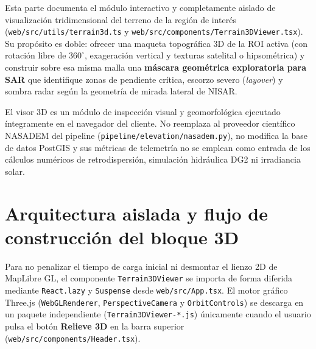\documentclass[11pt,a4paper]{article}
\newcommand{\src}[1]{\nolinkurl{#1}}
\begin{document}
Esta parte documenta el módulo interactivo y completamente aislado de visualización tridimensional del terreno
de la región de interés (\src{web/src/utils/terrain3d.ts} y \src{web/src/components/Terrain3DViewer.tsx}).
Su propósito es doble: ofrecer una maqueta topográfica 3D de la ROI activa (con rotación libre de $360^\circ$,
exageración vertical y texturas satelital o hipsométrica) y construir sobre esa misma malla una
\textbf{máscara geométrica exploratoria para SAR} que identifique zonas de pendiente crítica, escorzo severo
(\emph{layover}) y sombra radar según la geometría de mirada lateral de NISAR.

\begin{atencion}
El visor 3D es un módulo de inspección visual y geomorfológica ejecutado íntegramente en el navegador del
cliente. No reemplaza al proveedor científico NASADEM del pipeline (\src{pipeline/elevation/nasadem.py}), no
modifica la base de datos PostGIS y sus métricas de telemetría no se emplean como entrada de los cálculos
numéricos de retrodispersión, simulación hidráulica DG2 ni irradiancia solar.
\end{atencion}

\section{Arquitectura aislada y flujo de construcción del bloque 3D}
\label{sec:relieve3d-arquitectura}

Para no penalizar el tiempo de carga inicial ni desmontar el lienzo 2D de MapLibre GL, el componente
\texttt{Terrain3DViewer} se importa de forma diferida mediante \texttt{React.lazy} y \texttt{Suspense} desde
\src{web/src/App.tsx}. El motor gráfico Three.js (\texttt{WebGLRenderer}, \texttt{PerspectiveCamera} y
\texttt{OrbitControls}) se descarga en un paquete independiente (\texttt{Terrain3DViewer-*.js}) únicamente
cuando el usuario pulsa el botón \textbf{Relieve 3D} en la barra superior (\src{web/src/components/Header.tsx}).
\end{document}
